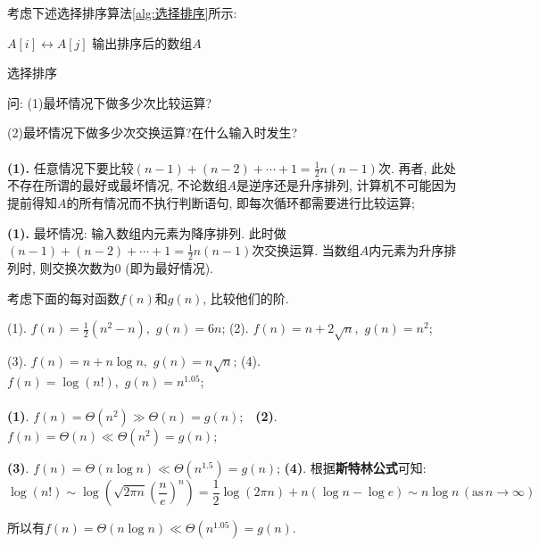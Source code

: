 \documentclass{article}
\begin{document}
\pagebreak

\begin{homeworkProblem}
	考虑下述选择排序算法\ref{alg:选择排序}所示: 
	
	\begin{algorithm}[H]
		\begin{algorithmic}[1]
				\State $A[i] \leftrightarrow  A[j]$
				\EndIf
			\EndFor
		\EndFor
		\State 输出排序后的数组$A$
		\end{algorithmic}
		\caption{选择排序}
		\label{alg:选择排序}
	\end{algorithm}
	问: (1)最坏情况下做多少次比较运算?

	(2)最坏情况下做多少次交换运算?在什么输入时发生?
	\\

	\solution
	\\

	\textbf{(1).} 任意情况下要比较$\left( n-1 \right) +\left( n-2 \right) +\cdots +1=\frac{1}{2}n\left( n-1 \right) $次. 再者, 此处不存在所谓的最好或最坏情况, 不论数组$A$是逆序还是升序排列, 计算机不可能因为提前得知$A$的所有情况而不执行判断语句, 即每次循环都需要进行比较运算;

	\textbf{(1).} 最坏情况: 输入数组内元素为降序排列. 此时做$\left( n-1 \right) +\left( n-2 \right) +\cdots +1=\frac{1}{2}n\left( n-1 \right) $次交换运算. 当数组$A$内元素为升序排列时, 则交换次数为0 (即为最好情况).
\end{homeworkProblem}

\begin{homeworkProblem}
	考虑下面的每对函数$f(n)$和$g(n)$, 比较他们的阶.

	(1). $f\left( n \right) =\frac{1}{2}\left( n^2-n \right) ,\,\, g\left( n \right) =6n$; \quad \quad (2). $f\left( n \right) =n+2\sqrt{n},\,\, g\left( n \right) =n^2$;

	(3). $f\left( n \right) =n+n\log n,\,\, g\left( n \right) =n\sqrt{n}$; \quad (4). $f\left( n \right) =\log \left( n! \right) ,\,\, g\left( n \right) =n^{1.05}$;
	\\

	\solution
	\\

	\textbf{(1)}. $f\left( n \right) =\Theta \left( n^2 \right) \gg \Theta \left( n \right) =g\left( n \right)$; \quad \quad \quad \,\,\,\,\textbf{(2)}. $f\left( n \right) =\Theta \left( n \right) \ll \Theta \left( n^2 \right) =g\left( n \right) $;

	\textbf{(3)}. $f\left( n \right) =\Theta \left( n\log n \right) \ll \Theta \left( n^{1.5} \right) =g\left( n \right) $; \quad \textbf{(4)}. 根据\textbf{斯特林公式}可知:$$\log \left( n! \right) \sim \log \left( \sqrt{2\pi n}\left( \frac{n}{e} \right) ^n \right) =\frac{1}{2}\log \left( 2\pi n \right) +n\left( \log n-\log e \right) \sim n\log n \, \left( \mathrm{as} \,n\rightarrow \infty \right) 
	$$

	所以有$f\left( n \right) =\Theta \left( n\log n \right) \ll \Theta \left( n^{1.05} \right) =g\left( n \right) $.
\end{homeworkProblem}
\end{document}
